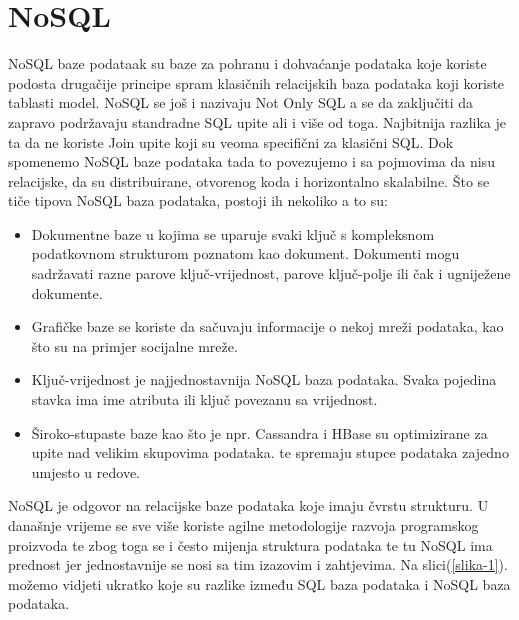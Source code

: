 \documentclass[a4paper,12pt]{foi}
\begin{document}
\chapter{NoSQL}
NoSQL baze podataak su baze za pohranu i dohvaćanje podataka koje koriste podosta drugačije principe spram klasičnih relacijskih baza podataka koji koriste tablasti model. NoSQL se još i nazivaju Not Only SQL a se da zaključiti da zapravo podržavaju standradne SQL upite ali i više od toga. Najbitnija razlika je ta da ne koriste Join upite koji su veoma specifični za klasični SQL. Dok spomenemo NoSQL baze podataka tada to povezujemo i sa pojmovima da nisu relacijske, da su distribuirane, otvorenog koda i horizontalno skalabilne.
Što se tiče tipova NoSQL baza podataka, postoji ih nekoliko a to su:
\begin{itemize}
\item Dokumentne baze u kojima se uparuje svaki ključ s kompleksnom podatkovnom strukturom poznatom kao dokument. Dokumenti mogu sadržavati razne parove ključ-vrijednost, parove ključ-polje ili čak i ugniježene dokumente.
\item Grafičke baze se koriste da sačuvaju informacije o nekoj mreži podataka, kao što su na primjer socijalne mreže.
\item Ključ-vrijednost je najjednostavnija NoSQL baza podataka. Svaka pojedina stavka ima ime atributa ili ključ povezanu sa vrijednost.
\item Široko-stupaste baze kao što je npr. Cassandra i HBase su optimizirane za upite nad velikim skupovima podataka. te spremaju stupce podataka zajedno umjesto u redove.
\end{itemize}

NoSQL je odgovor na relacijske baze podataka koje imaju čvrstu strukturu. U današnje vrijeme se sve više koriste agilne metodologije razvoja programskog proizvoda te zbog toga se i često mijenja struktura podataka te tu NoSQL ima prednost jer jednostavnije se nosi sa tim izazovim i zahtjevima. Na slici(\ref{slika-1}). možemo vidjeti ukratko koje su razlike između SQL baza podataka i NoSQL baza podataka.
\end{document}

